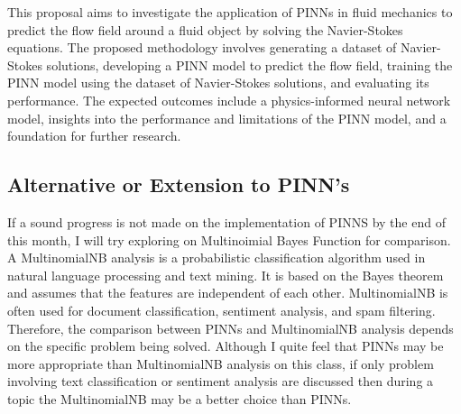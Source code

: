 This proposal aims to investigate the application of PINNs in fluid mechanics to predict the flow field around a fluid object by solving the Navier-Stokes equations. The proposed methodology involves generating a dataset of Navier-Stokes solutions, developing a PINN model to predict the flow field, training the PINN model using the dataset of Navier-Stokes solutions, and evaluating its performance. The expected outcomes include a physics-informed neural network model, insights into the performance and limitations of the PINN model, and a foundation for further research.

\subsection{Alternative or Extension to PINN's}
If a sound progress is not made on the implementation of PINNS by the end of this month, I will try exploring on Multinoimial Bayes Function for comparison. A MultinomialNB analysis is a probabilistic classification algorithm used in natural language processing and text mining. It is based on the Bayes theorem and assumes that the features are independent of each other. MultinomialNB is often used for document classification, sentiment analysis, and spam filtering. Therefore, the comparison between PINNs and MultinomialNB analysis depends on the specific problem being solved. Although I quite feel that PINNs may be more appropriate than MultinomialNB analysis on this class, if only problem involving text classification or sentiment analysis are discussed then during a topic the MultinomialNB may be a better choice than PINNs.